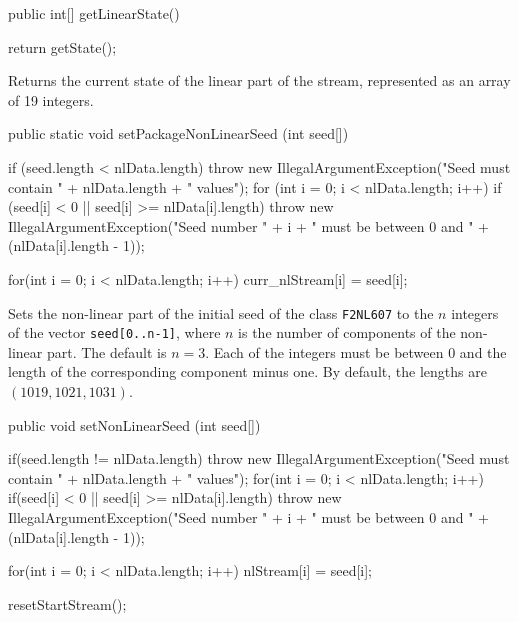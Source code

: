 \begin{code}

   public int[] getLinearState() \begin{hide} {
      return getState();
   } \end{hide}
\end{code}
\begin{tabb} Returns the current state of the linear part of the stream,
  represented as an array of 19 integers.
\end{tabb}
\begin{htmlonly}
\end{htmlonly}
\begin{code}

   public static void setPackageNonLinearSeed (int seed[]) \begin{hide} {
      if (seed.length < nlData.length)
         throw new IllegalArgumentException("Seed must contain " +
                                            nlData.length + " values");
      for (int i = 0; i < nlData.length; i++)
         if (seed[i] < 0 || seed[i] >= nlData[i].length)
            throw new IllegalArgumentException("Seed number " + i +
                                               " must be between 0 and " +
                                               (nlData[i].length - 1));

      for(int i = 0; i < nlData.length; i++)
         curr_nlStream[i] = seed[i];
   } \end{hide}
\end{code}
\begin{tabb} Sets the non-linear part of the initial seed of the class
  \texttt{F2NL607} to the $n$ integers of the vector \texttt{seed[0..n-1]},
  where $n$ is the number of components of the non-linear part. The
  default is $n = 3$.
  Each of the integers must be between 0 and the length of the corresponding
  component minus one. By default, the lengths are $(1019, 1021, 1031)$.
\end{tabb}
\begin{htmlonly}
\end{htmlonly}
\begin{code}

   public void setNonLinearSeed (int seed[]) \begin{hide} {
      if(seed.length != nlData.length)
         throw new IllegalArgumentException("Seed must contain " +
                                            nlData.length + " values");
      for(int i = 0; i < nlData.length; i++)
         if(seed[i] < 0 || seed[i] >= nlData[i].length)
            throw new IllegalArgumentException("Seed number " + i +
                                               " must be between 0 and " +
                                               (nlData[i].length - 1));

      for(int i = 0; i < nlData.length; i++)
         nlStream[i] = seed[i];

      resetStartStream();
   } \end{hide}
\end{code}
